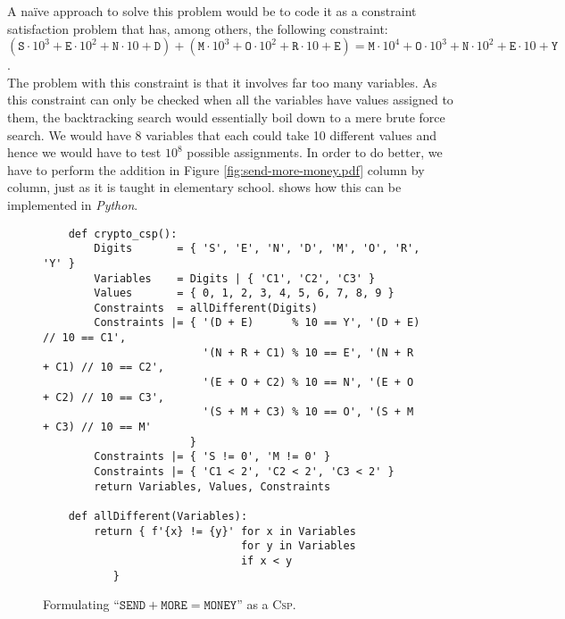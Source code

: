 \noindent
A na\"ive approach to solve this problem would be to code it as a constraint satisfaction problem that has,
among others,  the
following constraint:
\\[0.2cm]
\hspace*{0.0cm}
$   (\texttt{S} \cdot 10^3 + \texttt{E} \cdot 10^2 + \texttt{N} \cdot 10 + \texttt{D}) 
  + (\texttt{M} \cdot 10^3 + \texttt{O} \cdot 10^2 + \texttt{R} \cdot 10 + \texttt{E})
  = \texttt{M} \cdot 10^4 + \texttt{O} \cdot 10^3 + \texttt{N} \cdot 10^2 + \texttt{E} \cdot 10 + \texttt{Y}
$.
\\[0.2cm]
The problem with this constraint is that it involves far too many variables.  As this constraint can only be
checked when all the variables have values assigned to them, the backtracking search would essentially
boil down to a mere brute force search.  We would have 8 variables that each could take 10 different values and
hence we would have to test $10^{8}$ possible assignments. In order to do better, we have to perform the addition in Figure
 \ref{fig:send-more-money.pdf} column by column, just as it is taught in elementary school.
  shows how this can be implemented in \textsl{Python}.

\begin{figure}[!ht]
\centering
\begin{verbatim}
    def crypto_csp():
        Digits       = { 'S', 'E', 'N', 'D', 'M', 'O', 'R', 'Y' }
        Variables    = Digits | { 'C1', 'C2', 'C3' }
        Values       = { 0, 1, 2, 3, 4, 5, 6, 7, 8, 9 }
        Constraints  = allDifferent(Digits)
        Constraints |= { '(D + E)      % 10 == Y', '(D + E)      // 10 == C1',
                         '(N + R + C1) % 10 == E', '(N + R + C1) // 10 == C2',
                         '(E + O + C2) % 10 == N', '(E + O + C2) // 10 == C3',
                         '(S + M + C3) % 10 == O', '(S + M + C3) // 10 == M'
                       }
        Constraints |= { 'S != 0', 'M != 0' }
        Constraints |= { 'C1 < 2', 'C2 < 2', 'C3 < 2' }
        return Variables, Values, Constraints
    
    def allDifferent(Variables):
        return { f'{x} != {y}' for x in Variables
                               for y in Variables 
                               if x < y 
           }
\end{verbatim}
\vspace*{-0.3cm}
\caption{Formulating ``$\texttt{SEND} + \texttt{MORE} = \texttt{MONEY}$'' as a \textsc{Csp}.}
\label{fig:Crypto-Arithmetic.ipynb}
\end{figure}

